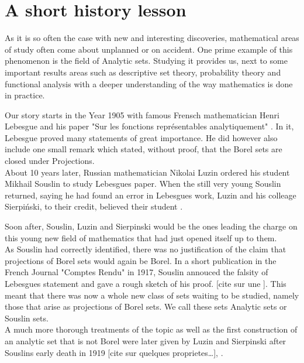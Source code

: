 \documentclass[10pt, a4paper, titlepage]{article}
\numberwithin{equation}{section}
\begin{document}
\hypersetup{pageanchor=false}


\newpage

\thispagestyle{empty}



\newpage

\tableofcontents

\newpage
\hypersetup{pageanchor=true}
\renewcommand{\thepage}{ \arabic{page} }

\setcounter{page}{1}
\onehalfspacing







\section{A short history lesson}
As it is so often the case with new and interesting discoveries, mathematical areas of study often come about unplanned or on accident. 
One prime example of this phenomenon is the field of Analytic sets. 
Studying it provides us, next to some important results areas such as descriptive set theory, probability theory and functional analysis with a deeper understanding of the way mathematics is done in practice.

Our story starts in the Year 1905 with famous Frensch mathematician Henri Lebesgue and his paper "Sur les fonctions représentables analytiquement" \cite{lebesgue1905}. 
In it, Lebesgue proved many statements of great importance. 
He did however also include one small remark which stated, without proof, that the Borel sets are closed under Projections. \\
About 10 years later, Russian mathematician Nikolai Luzin ordered his student Mikhail Souslin to study Lebesgues paper. 
When the still very young Souslin returned, saying he had found an error in Lebesgues work, Luzin and his colleage Sierpiński, to their credit, believed their student \cite{sierpinski1950}.

Soon after, Souslin, Luzin and Sierpinski would be the ones leading the charge on this young new field of mathematics that had just opened itself up to them\cite{rogers1980}. \\
As Souslin had correctly identified, there was no justification of the claim that projections of Borel sets would again be Borel.
In a short publication in the French Journal "Comptes Rendu" in 1917, Souslin annouced the falsity of Lebesgues statement and gave a rough sketch of his proof. [cite sur une ].
This meant that there was now a whole new class of sets waiting to be studied, namely those that arise as projections of Borel sets. We call these sets Analytic sets or Souslin sets.\\
A much more thorough treatments of the topic as well as the first construction of an analytic set that is not Borel were later given by Luzin and Sierpinski after Souslins early death in 1919 [cite sur quelques proprietes\ldots], \cite{lusin1923} \cite{lusin1927}.
\end{document}
